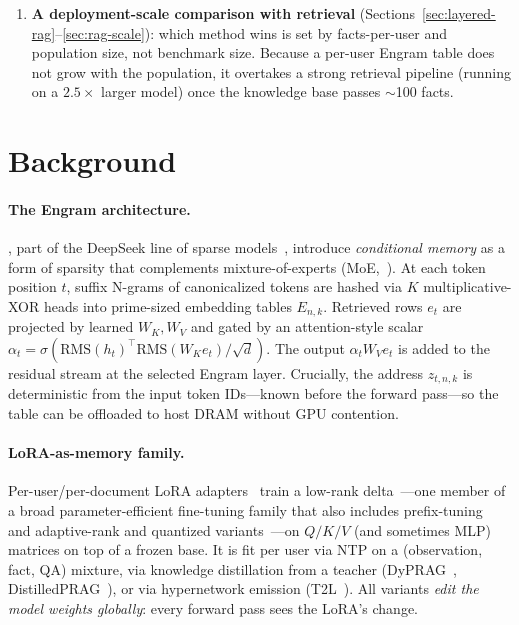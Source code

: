\documentclass[11pt]{article}
\begin{document}
\begin{enumerate}[leftmargin=*,topsep=2pt,itemsep=2pt]
        system) and beats every all-in-one baseline on direct
        recall, indirect reasoning ($5.6\times$ over per-user
        LoRA on average), contamination, and per-user reasoning regressions.
        The lead survives a personal $\to$ medical schema shift.
  \item \textbf{A deployment-scale comparison with retrieval}
        (Sections~\ref{sec:layered-rag}--\ref{sec:rag-scale}):
        which method wins is set by facts-per-user and population
        size, not benchmark size. Because a per-user Engram table
        does not grow with the population, it overtakes a strong
        retrieval pipeline (running on a $2.5\times$ larger
        model) once the knowledge base passes $\sim$100 facts.
\end{enumerate}

\section{Background}
\label{sec:background}

\paragraph{The Engram architecture.} \citet{cheng2026engram}, part
of the DeepSeek line of sparse
models~\citep{dai2024deepseekmoe,deepseekai2024v3}, introduce
\emph{conditional memory} as a form of sparsity that complements
mixture-of-experts (MoE,~\citealt{shazeer2017moe,dai2024deepseekmoe}).
At each token position $t$, suffix N-grams of canonicalized tokens are
hashed via $K$ multiplicative-XOR heads into prime-sized embedding
tables $E_{n,k}$. Retrieved rows $e_t$ are projected by learned
$W_K, W_V$ and gated by an attention-style scalar
$\alpha_t = \sigma(\mathrm{RMS}(h_t)^\top \mathrm{RMS}(W_K e_t)/\sqrt{d})$.
The output $\alpha_t W_V e_t$ is added to the residual stream at the
selected Engram layer. Crucially, the address $z_{t,n,k}$ is
deterministic from the input token IDs---known before the forward
pass---so the table can be offloaded to host DRAM without GPU
contention.

\paragraph{LoRA-as-memory family.} Per-user/per-document LoRA
adapters~\citep{su2024prag,tan2024oppu,zhuang2024hydra,t2l2024,
tan2024perpcs,memlora2025} train a low-rank
delta~\citep{hu2022lora,houlsby2019adapters,mangrulkar2022peft}---one
member of a broad parameter-efficient fine-tuning family that also
includes prefix-tuning~\citep{li2021prefix} and adaptive-rank and
quantized variants~\citep{zhang2023adalora,dettmers2023qlora}---on
$Q/K/V$ (and sometimes MLP) matrices on top of a frozen base.
It is fit per user via NTP on a
(observation, fact, QA) mixture,
via knowledge distillation from a teacher
(DyPRAG~\citep{tan2025dyprag},
DistilledPRAG~\citep{distilledprag2025}), or via hypernetwork
emission (T2L~\citep{t2l2024}). All variants \emph{edit the model
weights globally}: every forward pass sees the LoRA's change.
\end{document}
